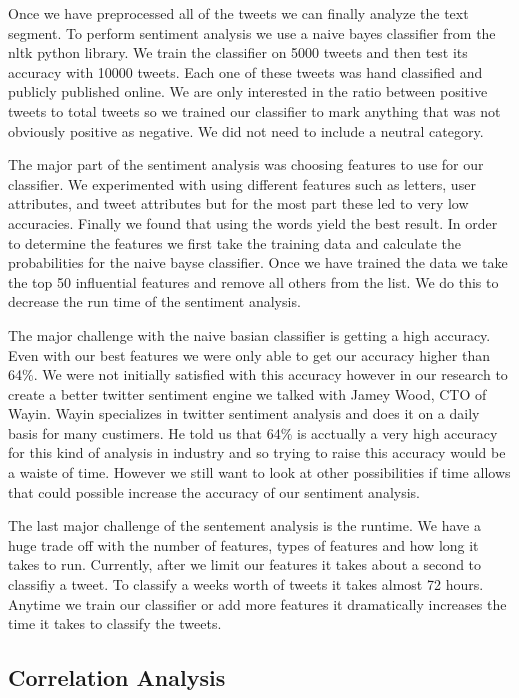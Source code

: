 \documentclass{acm_proc_article-sp}
\begin{document}
Once we have preprocessed all of the tweets we can finally analyze the text
segment. To perform sentiment analysis we use a naive bayes classifier from the
nltk python library. We train the classifier on 5000 tweets and then test its
accuracy with 10000 tweets. Each one of these tweets was hand classified and
publicly published online. We are only interested in the ratio between positive
tweets to total tweets so we trained our classifier to mark anything that was
not obviously positive as negative. We did not need to include a neutral
category.

The major part of the sentiment analysis was choosing features to use for our
classifier. We experimented with using different features such as letters, user
attributes, and tweet attributes but for the most part these led to very low
accuracies. Finally we found that using the words yield the best result. In
order to determine the features we first take the training data and calculate
the probabilities for the naive bayse classifier. Once we have trained the data
we take the top 50 influential features and remove all others from the list. We
do this to decrease the run time of the sentiment analysis.

The major challenge with the naive basian classifier is getting a high
accuracy. Even with our best features we were only able to get our accuracy
higher than 64\%.  We were not initially satisfied with this accuracy however
in our research to create a better twitter sentiment engine we talked with
Jamey Wood, CTO of Wayin. Wayin specializes in twitter sentiment analysis and
does it on a daily basis for many custimers. He told us that 64\% is acctually
a very high accuracy for this kind of analysis in industry and so trying to
raise this accuracy would be a waiste of time. However we still want to look at
other possibilities if time allows that could possible increase the accuracy of
our sentiment analysis. 

The last major challenge of the sentement analysis is the runtime. We have a
huge trade off with the number of features, types of features and how long it
takes to run. Currently, after we limit our features it takes about a second to
classifiy a tweet. To classify a weeks worth of tweets it takes almost 72
hours. Anytime we train our classifier or add more features it dramatically
increases the time it takes to classify the tweets.

\subsection{Correlation Analysis}
\end{document}
